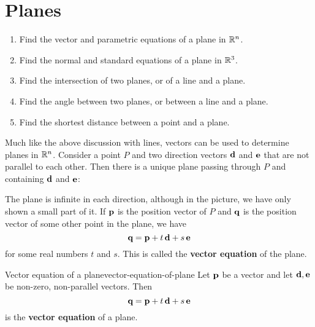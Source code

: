 \section{Planes}
\label{sec:planes}

\begin{outcome}
  \begin{enumerate}
  \item Find the vector and parametric equations of a plane in $\mathbb{R}^n$.
  \item Find the normal and standard equations of a plane in $\mathbb{R}^3$.
  \item Find the intersection of two planes, or of a line and a plane.
  \item Find the angle between two planes, or between a line and a plane.
  \item Find the shortest distance between a point and a plane.
  \end{enumerate}
\end{outcome}

Much like the above discussion with lines, vectors can be used to
determine planes in $\mathbb{R}^n$. Consider a point $P$ and two direction
vectors $\vect{d}$ and $\vect{e}$ that are not parallel to each
other. Then there is a unique plane passing through $P$ and containing
$\vect{d}$ and $\vect{e}$:
\begin{center}
\end{center}
The plane is infinite in each direction, although in the picture, we
have only shown a small part of it. If $\vect{p}$ is the position
vector of $P$ and $\vect{q}$ is the position vector of some other
point in the plane, we have
\begin{equation*}
  \vect{q} = \vect{p} + t\,\vect{d} + s\,\vect{e}
\end{equation*}
for some real numbers $t$ and $s$. This is called the \textbf{vector
  equation}%
%
 of the plane.

\begin{definition}{Vector equation of a plane}{vector-equation-of-plane}
  Let $\vect{p}$ be a vector and let $\vect{d},\vect{e}$ be non-zero,
  non-parallel vectors. Then
  \begin{equation*}
    \vect{q} = \vect{p} + t\,\vect{d} + s\,\vect{e}
  \end{equation*}
  is the \textbf{vector equation}%
   of a plane.
\end{definition}

